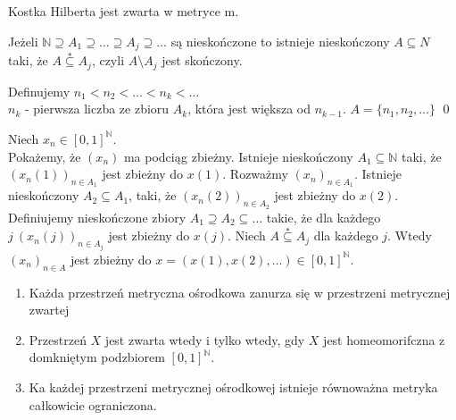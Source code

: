 \begin{tw} Kostka Hilberta jest zwarta w metryce m. \end{tw} 
\begin{lem} 
    Jeżeli $\mathbb{N} \supseteq A_1 \supseteq \ldots \supseteq A_j \supseteq \ldots $ są nieskończone to 
    istnieje nieskończony $A \subseteq N$ taki, że $A \overset{\ast}{\subseteq} A_j$, czyli
    $A \setminus A_j$ jest skończony.
    \begin{dd} 
        Definujemy $n_1 < n_2 < \ldots < n_k < \ldots$ \\ 
        $n_k$ - pierwsza liczba ze zbioru $A_k$, która jest większa od $n_{k-1}$.
        $A = \{n_1,n_2,\ldots\}$ \hfill \qed
    \end{dd} 
\end{lem} 
\begin{dd} 
    Niech $x_n \in [0,1]^\mathbb{N}$. \\ 
    Pokażemy, że $(x_n)$ ma podciąg zbieżny. Istnieje nieskończony $A_1 \subseteq \mathbb{N}$ taki,  
    że $(x_n(1))_{n \in A_1}$ jest zbieżny do $x(1)$. Rozważmy $(x_n)_{n \in A_1}$. Istnieje 
    nieskończony $A_2 \subseteq A_1$, taki, że $(x_n (2))_{n \in A_2}$ jest zbieżny do $x(2)$. \\ 
    Definiujemy nieskończone zbiory $A_1 \supseteq A_2 \subseteq \ldots$ takie, że dla każdego 
    $j \ (x_n(j))_{n \in A_j}$ jest zbieżny do $x(j)$.
    Niech $A \overset{\ast}{\subseteq} A_j$ dla każdego $j$. Wtedy $(x_n)_{n \in A}$ jest zbieżny do 
    $x = (x(1),x(2),\ldots) \in [0,1]^\mathbb{N}$.
\end{dd} 

\begin{wn} \hfill 
    \begin{enumerate}[(1)]
        \item Każda przestrzeń metryczna ośrodkowa zanurza się w przestrzeni metrycznej zwartej
        \item Przestrzeń $X$ jest zwarta wtedy i tylko wtedy, gdy $X$ jest homeomorifczna z domkniętym
            podzbiorem $[0,1]^\mathbb{N}$.
        \item Ka każdej przestrzeni metrycznej ośrodkowej istnieje równoważna metryka całkowicie ograniczona.
    \end{enumerate}
\end{wn} 

